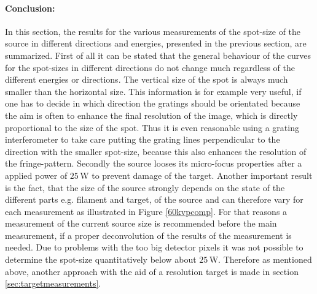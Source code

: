 \paragraph{Conclusion:} In this section, the results for the various measurements of the spot-size of the source in different directions and energies, presented in the previous section, are summarized. 
First of all it can be stated that the general behaviour of the curves for the spot-sizes in different directions do not change much regardless of the different energies or directions. The vertical size of the spot is always much smaller than the horizontal size. This information is for example very useful, if one has to decide in which direction the gratings should be orientated because the aim is often to enhance the final resolution of the image, which is directly proportional to the size of the spot. Thus it is even reasonable using a grating interferometer to take care putting the grating lines perpendicular to the direction with the smaller spot-size, because this also enhances the resolution of the fringe-pattern. Secondly the source looses its micro-focus properties after a applied power of $25\,$W to prevent damage of the target. Another important result is the fact, that the size of the source strongly depends on the state of the different parts e.g. filament and target, of the source and can therefore vary for each measurement as illustrated in Figure \ref{60kvpcomp}. For that reasons a measurement of the current source size is recommended before the main measurement, if a proper deconvolution of the results of the measurement is needed. Due to problems with the too big detector pixels it was not possible to determine the spot-size quantitatively below about $25\,$W. Therefore as mentioned above, another approach with the aid of a resolution target is made in section \ref{sec:targetmeasurements}. \clearpage        


